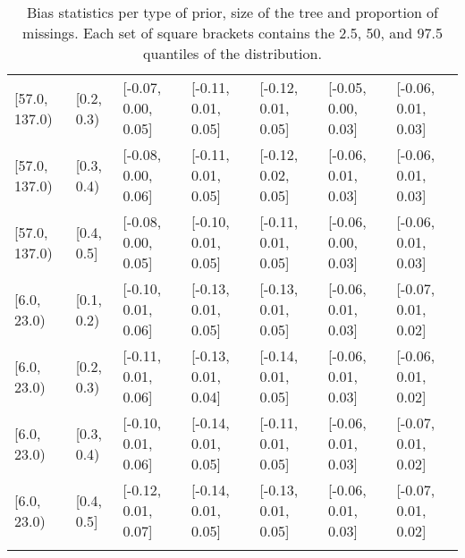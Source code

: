\begin{table}[ht]
\begin{tabular}{lllllll}
  {[57.0, 137.0)} & {[0.2, 0.3)} & {[-0.07, 0.00, 0.05]} & {[-0.11, 0.01, 0.05]} & {[-0.12, 0.01, 0.05]} & {[-0.05, 0.00, 0.03]} & {[-0.06, 0.01, 0.03]} \\ 
  {[57.0, 137.0)} & {[0.3, 0.4)} & {[-0.08, 0.00, 0.06]} & {[-0.11, 0.01, 0.05]} & {[-0.12, 0.02, 0.05]} & {[-0.06, 0.01, 0.03]} & {[-0.06, 0.01, 0.03]} \\ 
  {[57.0, 137.0)} & {[0.4, 0.5]} & {[-0.08, 0.00, 0.05]} & {[-0.10, 0.01, 0.05]} & {[-0.11, 0.01, 0.05]} & {[-0.06, 0.00, 0.03]} & {[-0.06, 0.01, 0.03]} \\ 
  {[6.0, 23.0)} & {[0.1, 0.2)} & {[-0.10, 0.01, 0.06]} & {[-0.13, 0.01, 0.05]} & {[-0.13, 0.01, 0.05]} & {[-0.06, 0.01, 0.03]} & {[-0.07, 0.01, 0.02]} \\ 
  {[6.0, 23.0)} & {[0.2, 0.3)} & {[-0.11, 0.01, 0.06]} & {[-0.13, 0.01, 0.04]} & {[-0.14, 0.01, 0.05]} & {[-0.06, 0.01, 0.03]} & {[-0.06, 0.01, 0.02]} \\ 
  {[6.0, 23.0)} & {[0.3, 0.4)} & {[-0.10, 0.01, 0.06]} & {[-0.14, 0.01, 0.05]} & {[-0.11, 0.01, 0.05]} & {[-0.06, 0.01, 0.03]} & {[-0.07, 0.01, 0.02]} \\ 
  {[6.0, 23.0)} & {[0.4, 0.5]} & {[-0.12, 0.01, 0.07]} & {[-0.14, 0.01, 0.05]} & {[-0.13, 0.01, 0.05]} & {[-0.06, 0.01, 0.03]} & {[-0.07, 0.01, 0.02]} \\ 
   \bottomrule
\multicolumn{7}{l}{}\\
\end{tabular}
\caption{Bias statistics per type of prior, size of the tree and proportion of missings. Each set of square brackets contains the 2.5, 50, and 97.5 quantiles of the distribution.} 
\label{tab:bias-prior-size-missigness}
\end{table}
